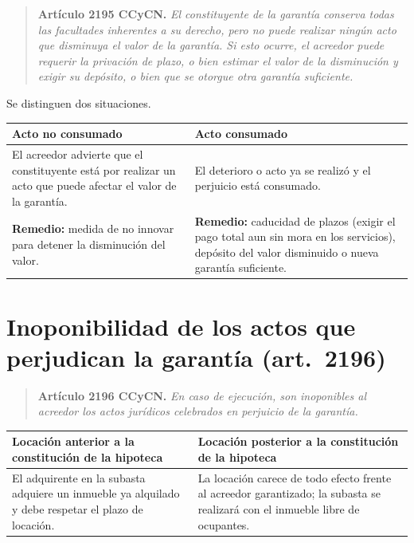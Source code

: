 \documentclass[12pt,oneside]{book}
\begin{document}
\begin{quote}
\textbf{Artículo 2195 CCyCN.} \textit{El constituyente de la garantía conserva todas las facultades inherentes a su derecho, pero no puede realizar ningún acto que disminuya el valor de la garantía. Si esto ocurre, el acreedor puede requerir la privación de plazo, o bien estimar el valor de la disminución y exigir su depósito, o bien que se otorgue otra garantía suficiente.}
\end{quote}

Se distinguen dos situaciones.

\begin{table}[H]
\centering
\begin{tabularx}{\textwidth}{L L}
\toprule
\textbf{Acto no consumado} & \textbf{Acto consumado} \\
\midrule
El acreedor advierte que el constituyente está por realizar un acto que puede afectar el valor de la garantía. &
El deterioro o acto ya se realizó y el perjuicio está consumado. \\
\addlinespace
\textbf{Remedio:} medida de no innovar para detener la disminución del valor. &
\textbf{Remedio:} caducidad de plazos (exigir el pago total aun sin mora en los servicios), depósito del valor disminuido o nueva garantía suficiente. \\
\bottomrule
\end{tabularx}
\end{table}

\section{Inoponibilidad de los actos que perjudican la garantía (art.~2196)}

\begin{quote}
\textbf{Artículo 2196 CCyCN.} \textit{En caso de ejecución, son inoponibles al acreedor los actos jurídicos celebrados en perjuicio de la garantía.}
\end{quote}

\begin{table}[H]
\centering
\begin{tabularx}{\textwidth}{L L}
\toprule
\textbf{Locación anterior a la constitución de la hipoteca} & \textbf{Locación posterior a la constitución de la hipoteca} \\
\midrule
El adquirente en la subasta adquiere un inmueble ya alquilado y debe respetar el plazo de locación. &
La locación carece de todo efecto frente al acreedor garantizado; la subasta se realizará con el inmueble libre de ocupantes. \\
\bottomrule
\end{tabularx}
\end{table}
\end{document}
